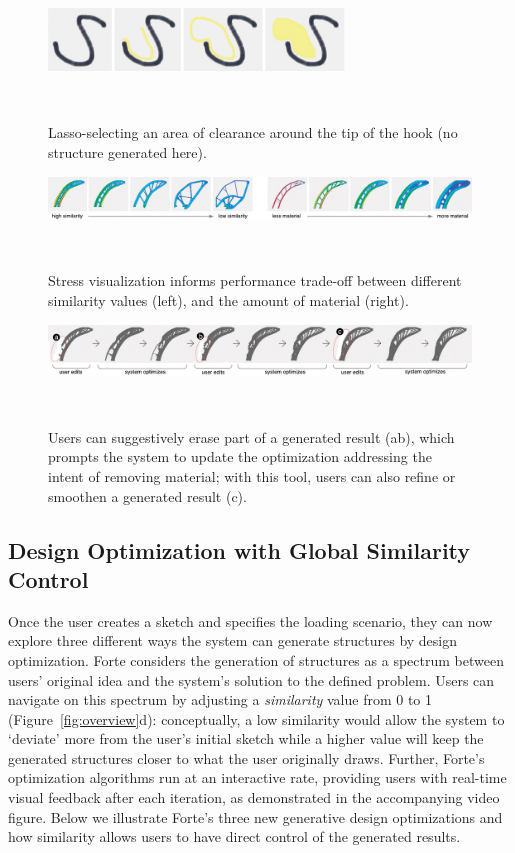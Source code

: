 \begin{figure} [h]
  \centering
  \vskip 4pt
  \includegraphics[width=0.7\textwidth]{figures/draw_clearance}
  \caption{Lasso-selecting an area of clearance around the tip of the hook (no structure generated here).}~\label{fig:draw_clearance}
\end{figure}

\begin{figure} [t]
  \centering
  \includegraphics[width=1\textwidth]{figures/sim_mat}
  \caption{Stress visualization informs performance trade-off between different similarity values (left), and the amount of material (right).}~\label{fig:sim_mat}
\end{figure}

\begin{figure} [t]
  \centering
  \includegraphics[width=1\textwidth]{figures/local_editing_eraser}
  \caption{Users can suggestively erase part of a generated result (ab), which prompts the system to update the optimization addressing the intent of removing material; with this tool, users can also refine or smoothen a generated result (c).}~\label{fig:local_editing_eraser}
\end{figure}

\subsection{Design Optimization with Global Similarity Control}

Once the user creates a sketch and specifies the loading scenario, they can now explore three different ways the system can generate structures by design optimization. Forte considers the generation of structures  as a spectrum between users' original idea and the system's solution to the defined problem. Users can navigate on this spectrum by adjusting a \textit{similarity} value from 0 to 1 (Figure~\ref{fig:overview}d): conceptually, a low similarity would allow the system to `deviate' more from the user's initial sketch while a higher value will keep the generated structures closer to what the user originally draws. Further, Forte's optimization algorithms run at an interactive rate, providing users with real-time visual feedback after each iteration, as demonstrated in the accompanying video figure.
Below we illustrate Forte's three new generative design optimizations and how similarity allows users to have direct control of the generated results.

